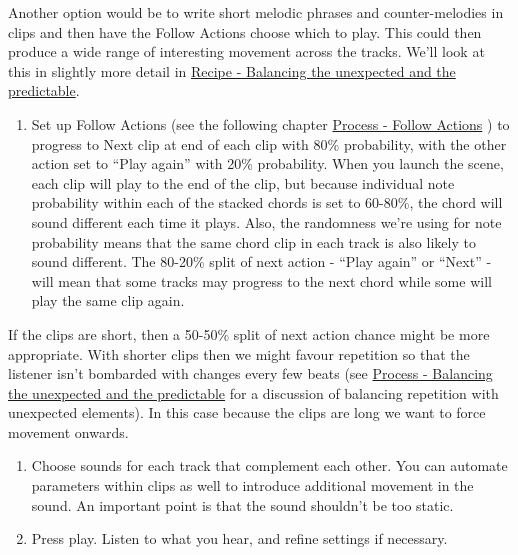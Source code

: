 \documentclass[
  12pt,
  letterpaper,
  oneside,
  open=any]{scrbook}
\providecommand{\tightlist}{%
  \setlength{\itemsep}{0pt}\setlength{\parskip}{0pt}}\usepackage{longtable,booktabs,array}
\begin{document}
Another option would be to write short melodic phrases and
counter-melodies in clips and then have the Follow Actions choose which
to play. This could then produce a wide range of interesting movement
across the tracks. We'll look at this in slightly more detail in
\hyperref[Chapter-010-Recipe-Balance_random_and_predictable]{Recipe -
Balancing the unexpected and the predictable}.

\begin{enumerate}
\def\labelenumi{\arabic{enumi}.}
\setcounter{enumi}{6}
\tightlist
\item
  Set up Follow Actions (see the following chapter
  \hyperref[Chapter-003-Process-Follow_Actions]{Process - Follow
  Actions} ) to progress to Next clip at end of each clip with 80\%
  probability, with the other action set to ``Play again'' with 20\%
  probability. When you launch the scene, each clip will play to the end
  of the clip, but because individual note probability within each of
  the stacked chords is set to 60-80\%, the chord will sound different
  each time it plays. Also, the randomness we're using for note
  probability means that the same chord clip in each track is also
  likely to sound different. The 80-20\% split of next action - ``Play
  again'' or ``Next'' - will mean that some tracks may progress to the
  next chord while some will play the same clip again.
\end{enumerate}

If the clips are short, then a 50-50\% split of next action chance might
be more appropriate. With shorter clips then we might favour repetition
so that the listener isn't bombarded with changes every few beats (see
\hyperref[Chapter-008-Process-Balance_unexpected_and_predictable]{Process
- Balancing the unexpected and the predictable} for a discussion of
balancing repetition with unexpected elements). In this case because the
clips are long we want to force movement onwards.

\begin{enumerate}
\def\labelenumi{\arabic{enumi}.}
\setcounter{enumi}{7}
\item
  Choose sounds for each track that complement each other. You can
  automate parameters within clips as well to introduce additional
  movement in the sound. An important point is that the sound shouldn't
  be too static.
\item
  Press play. Listen to what you hear, and refine settings if necessary.
\end{enumerate}
\end{document}
